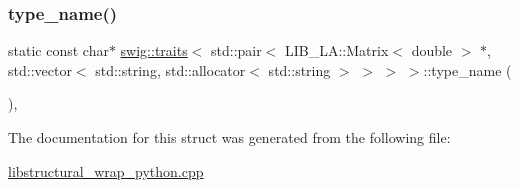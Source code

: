 \subsubsection{\texorpdfstring{type\+\_\+name()}{type\_name()}}
{\footnotesize\ttfamily static const char$\ast$ \hyperlink{structswig_1_1traits}{swig\+::traits}$<$ std\+::pair$<$ L\+I\+B\+\_\+\+L\+A\+::\+Matrix$<$ double $>$ $\ast$, std\+::vector$<$ std\+::string, std\+::allocator$<$ std\+::string $>$ $>$ $>$ $>$\+::type\+\_\+name (\begin{DoxyParamCaption}{ }\end{DoxyParamCaption})\hspace{0.3cm}{\ttfamily [inline]}, {\ttfamily [static]}}



The documentation for this struct was generated from the following file\+:\begin{DoxyCompactItemize}
\item 
\hyperlink{libstructural__wrap__python_8cpp}{libstructural\+\_\+wrap\+\_\+python.\+cpp}\end{DoxyCompactItemize}
